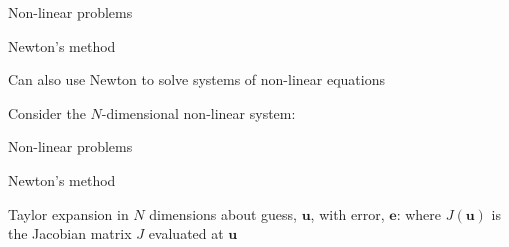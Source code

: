 \documentclass[18pt,xcolor=table]{beamer}
\begin{document}
\begin{frame}{Non-linear problems}
\begin{block}{Newton's method}
\bit
\item Can also use Newton to solve systems of non-linear equations
\item Consider the $N$-dimensional non-linear system:
\eit
\end{block}
\end{frame}

\begin{frame}{Non-linear problems}
\begin{block}{Newton's method}
\bit
\item Taylor expansion in $N$ dimensions about guess, $\mathbf{u}$, with error, $\mathbf{e}$:
where $J(\mathbf{u})$ is the Jacobian matrix $J$ evaluated at $\mathbf{u}$
\eit
\end{block}
\end{frame}
\end{document}
